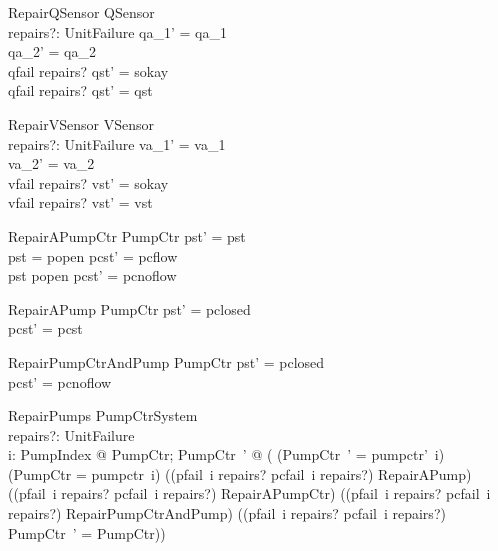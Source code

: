 \documentclass{report} %
\begin{document}
\begin{schema}{RepairQSensor}
  \Delta QSensor \\
  repairs?: \power UnitFailure
  \where
  qa\_1' = qa\_1 \\
  qa\_2' = qa\_2 \\
  qfail \in repairs? \implies qst' = sokay \\
  qfail \notin repairs? \implies qst' = qst
\end{schema}

\begin{schema}{RepairVSensor}
  \Delta VSensor \\
  repairs?: \power UnitFailure
  \where
  va\_1' = va\_1 \\
  va\_2' = va\_2 \\
  vfail \in repairs? \implies vst' = sokay \\
  vfail \notin repairs? \implies vst' = vst
\end{schema}

\begin{schema}{RepairAPumpCtr}
  \Delta PumpCtr
  \where
  pst' = pst \\
  pst = popen \implies pcst' = pcflow \\
  pst \neq popen \implies pcst' = pcnoflow
\end{schema}

\begin{schema}{RepairAPump}
  \Delta PumpCtr
  \where
  pst' = pclosed \\ %
  pcst' = pcst
\end{schema}

\begin{schema}{RepairPumpCtrAndPump}
  \Delta PumpCtr
  \where
  pst' = pclosed \\
  pcst' = pcnoflow
\end{schema}

\begin{schema}{RepairPumps}
  \Delta PumpCtrSystem \\
  repairs?: \power UnitFailure \\
  \where %
  \forall i: PumpIndex @ 
    \exists PumpCtr; PumpCtr~' @ ( 
        (\theta PumpCtr~' = pumpctr'~i) \land (\theta PumpCtr = pumpctr~i) \land
        ((pfail~i \in repairs? \land pcfail~i \notin repairs?) \implies RepairAPump) \land 
        ((pfail~i \notin repairs? \land pcfail~i \in repairs?) \implies RepairAPumpCtr) \land 
        ((pfail~i \in repairs? \land pcfail~i \in repairs?) \implies RepairPumpCtrAndPump) \land 
        ((pfail~i \notin repairs? \land pcfail~i \notin repairs?) \implies \theta PumpCtr~' = \theta PumpCtr))
\end{schema}
\end{document}
